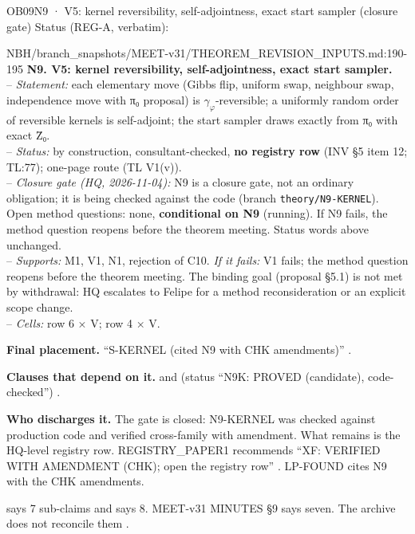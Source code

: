 \begin{card}{OB09}{N9 · V5: kernel reversibility, self-adjointness, exact start sampler (closure gate)}
Status (REG-A, verbatim):  
\begin{stmt}{NBH/branch_snapshots/MEET-v31/THEOREM_REVISION_INPUTS.md:190-195}
\textbf{N9. V5: kernel reversibility, self-adjointness, exact start sampler.}\\
– \emph{Statement:} each elementary move (Gibbs flip, uniform swap, neighbour swap, independence move with π₀ proposal) is $γ_φ$-reversible; a uniformly random order of reversible kernels is self-adjoint; the start sampler draws exactly from π₀ with exact Z̄₀.\\
– \emph{Status:} by construction, consultant-checked, \textbf{no registry row} (INV §5 item 12; TL:77); one-page route (TL V1(v)).\\
– \emph{Closure gate (HQ, 2026-11-04):} N9 is a closure gate, not an ordinary obligation; it is being checked against the code (branch \texttt{theory/N9-KERNEL}). Open method questions: none, \textbf{conditional on N9} (running). If N9 fails, the method question reopens before the theorem meeting. Status words above unchanged.\\
– \emph{Supports:} M1, V1, N1, rejection of C10. \emph{If it fails:} V1 fails; the method question reopens before the theorem meeting. The binding goal (proposal §5.1) is not met by withdrawal: HQ escalates to Felipe for a method reconsideration or an explicit scope change.\\
– \emph{Cells:} row 6 × V; row 4 × V.
\end{stmt}
\textbf{Final placement.} ``S-KERNEL (cited N9 with CHK amendments)'' .

\textbf{Clauses that depend on it.}  and  (status ``N9K: PROVED (candidate), code-checked'') .

\textbf{Who discharges it.} The gate is closed: N9-KERNEL was checked against production code and verified cross-family with amendment. What remains is the HQ-level registry row. REGISTRY\_PAPER1 recommends ``XF: VERIFIED WITH AMENDMENT (CHK); open the registry row'' . LP-FOUND cites N9 with the CHK amendments.
\begin{uncertain}
 says 7 sub-claims and  says 8. MEET-v31 MINUTES §9 says seven. The archive does not reconcile them .
\end{uncertain}
\end{card}

